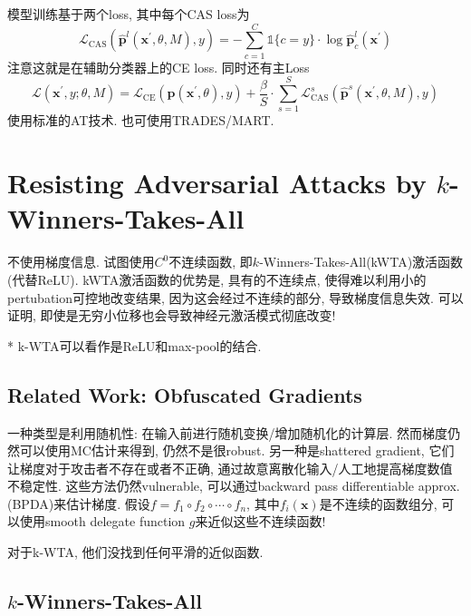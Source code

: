 \documentclass{article}
\begin{document}
模型训练基于两个loss, 其中每个CAS loss为
\begin{equation}
    \mathcal{L}_{\mathrm{CAS}}\left(\hat{\boldsymbol{p}}^{l}\left(\boldsymbol{x}^{\prime}, \theta, M\right), y\right)=-\sum_{c=1}^{C} \mathbb{1}\{c=y\} \cdot \log \hat{\boldsymbol{p}}_{c}^{l}\left(\boldsymbol{x}^{\prime}\right)
\end{equation}
注意这就是在辅助分类器上的CE loss.
同时还有主Loss
\begin{equation}
    \mathcal{L}\left(\boldsymbol{x}^{\prime}, y ; \theta, M\right)=\mathcal{L}_{\mathrm{CE}}\left(\boldsymbol{p}\left(\boldsymbol{x}^{\prime}, \theta\right), y\right)+\frac{\beta}{S} \cdot \sum_{s=1}^{S} \mathcal{L}_{\mathrm{CAS}}^{s}\left(\hat{\boldsymbol{p}}^{s}\left(\boldsymbol{x}^{\prime}, \theta, M\right), y\right)
\end{equation}
使用标准的AT技术. 也可使用TRADES/MART.

\section{Resisting Adversarial Attacks by $k$-Winners-Takes-All}
\newcommand{\kwta}{$k$-Winners-Takes-All}
不使用梯度信息. 试图使用$C^0$不连续函数, 即\kwta(kWTA)激活函数(代替ReLU). kWTA激活函数的优势是, 具有的不连续点, 使得难以利用小的pertubation可控地改变结果, 因为这会经过不连续的部分, 导致梯度信息失效. 可以证明, 即使是无穷小位移也会导致神经元激活模式彻底改变!

* k-WTA可以看作是ReLU和max-pool的结合.

\subsection{Related Work: Obfuscated Gradients}

一种类型是利用随机性: 在输入前进行随机变换/增加随机化的计算层. 然而梯度仍然可以使用MC估计来得到, 仍然不是很robust. 另一种是shattered gradient, 它们让梯度对于攻击者不存在或者不正确, 通过故意离散化输入/人工地提高梯度数值不稳定性. 这些方法仍然vulnerable, 可以通过backward pass differentiable approx.(BPDA)来估计梯度. 假设$f=f_{1} \circ f_{2} \circ \cdots \circ f_{n}$, 其中$f_{i}(\boldsymbol{x})$是不连续的函数组分, 可以使用smooth delegate function $g$来近似这些不连续函数!

对于k-WTA, 他们没找到任何平滑的近似函数.

\subsection{\kwta}
\end{document}
